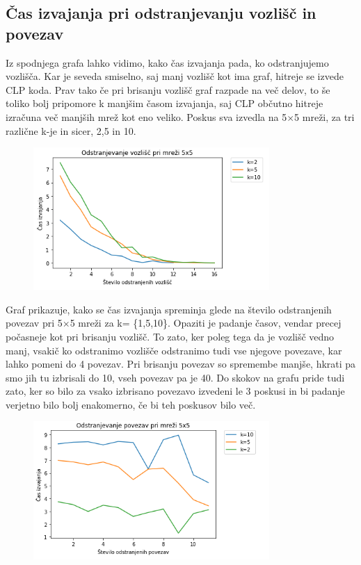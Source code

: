 \documentclass[a4paper]{article}
\begin{document}
\subsection{Čas izvajanja pri odstranjevanju vozlišč in povezav}
Iz spodnjega grafa lahko vidimo, kako čas izvajanja pada, ko odstranjujemo vozlišča. Kar je seveda smiselno, saj manj vozlišč kot ima graf, hitreje se izvede CLP koda. Prav tako če pri brisanju vozlišč graf razpade na več delov, to še toliko bolj pripomore k manjšim časom izvajanja, saj CLP občutno hitreje izračuna več manjših mrež kot eno veliko. Poskus sva izvedla na 5$\times$5 mreži, za tri različne k-je in sicer, 2,5 in 10. 
\begin{figure}[h!]
  \centering
  \includegraphics[width= 0.8\textwidth]{cas_vozlisca}
\end{figure}
\newpage

Graf prikazuje, kako se čas izvajanja spreminja glede na število odstranjenih povezav pri 5$\times$5 mreži za k= \{1,5,10\}. Opaziti je padanje časov, vendar precej počasneje kot pri brisanju vozlišč. To zato, ker poleg tega da je vozlišč vedno manj, vsakič ko odstranimo vozlišče odstranimo tudi vse njegove povezave, kar lahko pomeni do 4 povezav. Pri brisanju povezav so spremembe manjše, hkrati pa smo jih tu izbrisali do 10, vseh povezav pa je 40. Do skokov na grafu pride tudi zato, ker so bilo za vsako izbrisano povezavo izvedeni le 3 poskusi in bi padanje verjetno bilo bolj enakomerno, če bi teh poskusov bilo več.
\begin{figure}[h]
  \centering
  \includegraphics[width= 0.8\textwidth]{cas_povezave}
\end{figure}
\end{document}
